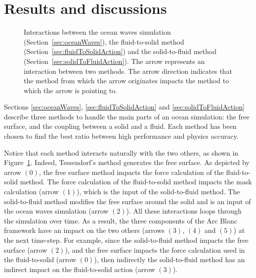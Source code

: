 \documentclass[final]{jcgt}
\def\framework{the Arc Blanc framework\xspace}
\def\ie{\emph{i.e.}\xspace}
\begin{document}


\section{Results and discussions}
\label{sec:results_and_discussions}


\begin{figure}
	\centering
	
	\caption{Interactions between the ocean waves simulation (Section~\ref{sec:oceanWaves}), the fluid-to-solid method (Section~\ref{sec:fluidToSolidAction}) and the solid-to-fluid method (Section~\ref{sec:solidToFluidAction}).
		The arrow represents an interaction between two methods.
		The arrow direction indicates that the method from which the arrow originates impacts the method to which the arrow is pointing to.}
	\label{fig:interactionMethods}
\end{figure}

Sections \ref{sec:oceanWaves}, \ref{sec:fluidToSolidAction} and \ref{sec:solidToFluidAction} describe three methods to handle the main parts of an ocean simulation: the free surface, and the coupling between a solid and a fluid.
Each method has been chosen to find the best ratio between high performance and physics accuracy.

Notice that each method interacts naturally with the two others, as shown in Figure~\ref{fig:interactionMethods}.
Indeed, Tessendorf's method generates the free surface.
As depicted by arrow $(0)$, the free surface method impacts the force calculation of the fluid-to-solid method.
The force calculation of the fluid-to-solid method impacts the mask calculation (arrow $(1)$), which is the input of the solid-to-fluid method.
The solid-to-fluid method modifies the free surface around the solid and is an input of the ocean waves simulation (arrow $(2)$).
All these interactions loops through the simulation over time. 
As a result, the three components of \framework have an impact on the two others (arrows $(3)$, $(4)$ and $(5)$) at the next time-step.
For example, since the solid-to-fluid method impacts the free surface (arrow $(2)$), and the free surface impacts the force calculation used in the fluid-to-solid (arrow $(0)$), then indirectly the solid-to-fluid method has an indirect impact on the fluid-to-solid action (arrow $(3)$).
\end{document}
